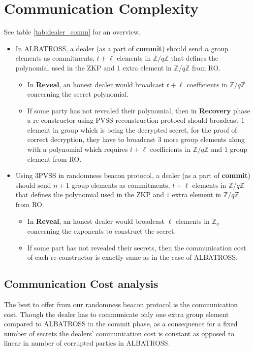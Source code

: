 \section{Communication Complexity}

See table \ref{tab:dealer_comm} for an overview.
\begin{itemize}
    \item In ALBATROSS, a dealer (as a part of \textbf{commit}) should send $n$ group elements as commitments, $t+\ell$ elements in $\mathbb{Z}/q\mathbb{Z}$ that defines the polynomial used in the ZKP and $1$ extra element in $\mathbb{Z}/q\mathbb{Z}$ from RO. 
    \begin{itemize}
        \item In \textbf{Reveal}, an honest dealer would broadcast $t+\ell$ coefficients in $\mathbb{Z}/q\mathbb{Z}$ concerning the secret polynomial.
        \item If some party has not revealed their polynomial, then in \textbf{Recovery} phase a re-constructor using PVSS reconstruction protocol should broadcast $1$ element in group which is being the decrypted secret, for the proof of correct decryption, they have to broadcast $3$ more group elements along with a polynomial which requires $t+\ell$ coefficients in $\mathbb{Z}/q\mathbb{Z}$ and $1$ group element from RO.
    \end{itemize}
    \item Using 3PVSS in randomness beacon protocol, a dealer (as a part of \textbf{commit}) should send $n+1$ group elements as commitments, $t+\ell$ elements in $\mathbb{Z}/q\mathbb{Z}$ that defines the polynomial used in the ZKP and $1$ extra element in $\mathbb{Z}/q\mathbb{Z}$ from RO.
    \begin{itemize}
        \item In \textbf{Reveal}, an honest dealer would broadcast $\ell$ elements in $\mathbb{Z}_q$ concerning the exponents to construct the secret.
        \item If some part has not revealed their secrets, then the communication cost of each re-constructor is exactly same as in the case of ALBATROSS.
    \end{itemize}
\end{itemize}

\subsection{Communication Cost analysis}
The best to offer from our randomness beacon protocol is the communication cost. Though the dealer has to communicate only 
one extra group element compared to ALBATROSS in the commit phase, as a consequence for a fixed number of secrets the 
dealers' communication cost is constant as opposed to linear in number of corrupted parties in ALBATROSS. \par

